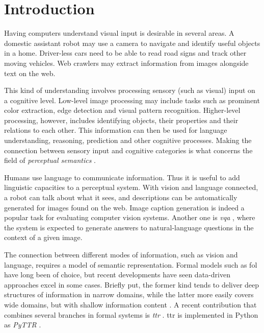 \glsresetall
\section{Introduction}
\label{sec:intro}

Having computers understand visual input is desirable in several areas.
A domestic assistant robot may use a camera to navigate and identify useful objects in a home.
Driver-less cars need to be able to read road signs and track other moving vehicles.
Web crawlers may extract information from images alongside text on the web.

This kind of understanding involves processing sensory (such as visual) input on a cognitive level.
Low-level image processing may include tasks such as prominent color extraction, edge detection and visual pattern recognition.
Higher-level processing, however, includes identifying objects, their properties and their relations to each other.
This information can then be used for language understanding, reasoning, prediction and other cognitive processes.
Making the connection between sensory input and cognitive categories is what concerns the field of \textit{perceptual semantics} \citep{PustejovskyPerceptualsemanticsconstruction1990}.

Humans use language to communicate information.
Thus it is useful to add linguistic capacities to a perceptual system.
With vision and language connected, a robot can talk about what it sees, and descriptions can be automatically generated for images found on the web.
Image caption generation is indeed a popular task for evaluating computer vision systems.
Another one is \textit{\gls{vqa}} \citep{AgrawalVQAVisualQuestion2015}, where the system is expected to generate answers to natural-language questions in the context of a given image.

The connection between different modes of information, such as vision and language, requires a model of semantic representation.
Formal models such as \gls{fol} have long been of choice, but recent developments have seen data-driven approaches excel in some cases.
Briefly put, the former kind tends to deliver deep structures of information in narrow domains, while the latter more easily covers wide domains, but with shallow information content \citep{Dobnik:2017ag}.
A recent contribution that combines several branches in formal systems is \textit{\gls{ttr}} \citep{CooperAustiniantruthattitudes2005,CooperTypetheorylanguage2016}.
\Gls{ttr} is implemented in Python as \textit{PyTTR} \citep{pyttr}.

